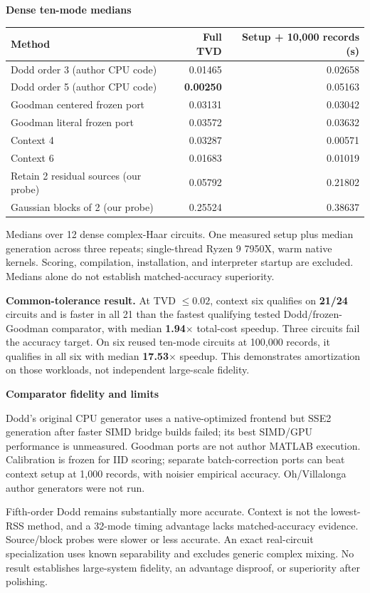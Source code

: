 \documentclass[11pt,letterpaper]{article}
\newcommand{\subheading}[1]{{\bfseries\color{ink}#1}\par}
\newcommand{\panel}[1]{\par\vspace{2pt}\begingroup\setlength{\fboxsep}{8pt}\colorbox{pale}{\parbox{\dimexpr\linewidth-16pt\relax}{#1}}\endgroup\par\vspace{3pt}}
\begin{document}
\subheading{Dense ten-mode medians}
\begin{center}
\small
\begin{tabularx}{\linewidth}{Yrr}
\toprule
\textbf{Method} & \textbf{Full TVD} & \textbf{Setup + 10,000 records (s)}\\
\midrule
Dodd order 3 (author CPU code) & 0.01465 & 0.02658\\
Dodd order 5 (author CPU code) & \textbf{0.00250} & 0.05163\\
Goodman centered frozen port & 0.03131 & 0.03042\\
Goodman literal frozen port & 0.03572 & 0.03632\\
Context 4 & 0.03287 & 0.00571\\
Context 6 & 0.01683 & 0.01019\\
Retain 2 residual sources (our probe) & 0.05792 & 0.21802\\
Gaussian blocks of 2 (our probe) & 0.25524 & 0.38637\\
\bottomrule
\end{tabularx}
\end{center}
{\small\color{muted}Medians over 12 dense complex-Haar circuits. One measured setup plus median generation across three repeats; single-thread Ryzen 9 7950X, warm native kernels. Scoring, compilation, installation, and interpreter startup are excluded. Medians alone do not establish matched-accuracy superiority.}

\panel{\textbf{Common-tolerance result.} At TVD $\leq0.02$, context six qualifies on \textbf{21/24} circuits and is faster in all 21 than the fastest qualifying tested Dodd/frozen-Goodman comparator, with median \textbf{1.94$\times$} total-cost speedup. Three circuits fail the accuracy target. On six reused ten-mode circuits at 100,000 records, it qualifies in all six with median \textbf{17.53$\times$} speedup. This demonstrates amortization on those workloads, not independent large-scale fidelity.}

\subheading{Comparator fidelity and limits}
Dodd's original CPU generator uses a native-optimized frontend but SSE2 generation after faster SIMD bridge builds failed; its best SIMD/GPU performance is unmeasured. Goodman ports are not author MATLAB execution. Calibration is frozen for IID scoring; separate batch-correction ports can beat context setup at 1,000 records, with noisier empirical accuracy. Oh/Villalonga author generators were not run.

Fifth-order Dodd remains substantially more accurate. Context is not the lowest-RSS method, and a 32-mode timing advantage lacks matched-accuracy evidence. Source/block probes were slower or less accurate. An exact real-circuit specialization uses known separability and excludes generic complex mixing. No result establishes large-system fidelity, an advantage disproof, or superiority after polishing.
\end{document}
